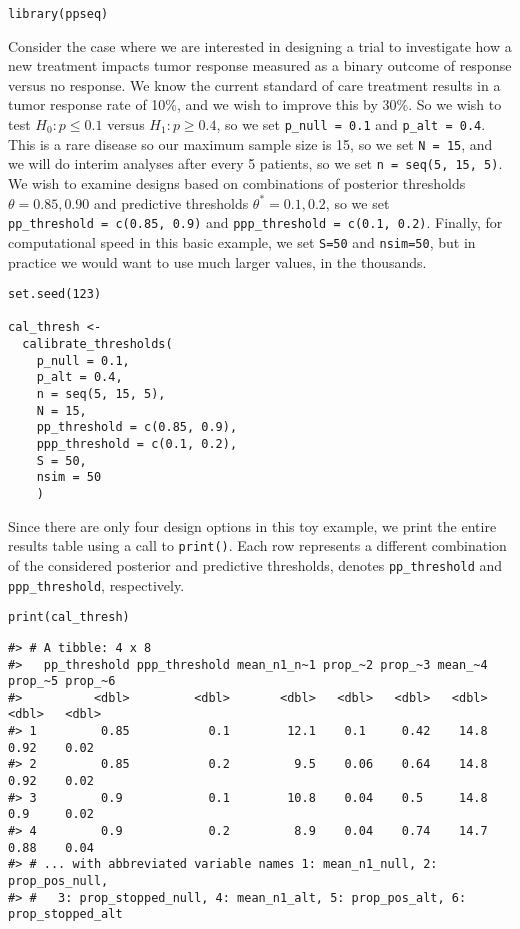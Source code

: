 \begin{verbatim}
library(ppseq)
\end{verbatim}

Consider the case where we are interested in designing a trial to investigate how a new treatment impacts tumor response measured as a binary outcome of response versus no response. We know the current standard of care treatment results in a tumor response rate of 10\%, and we wish to improve this by 30\%. So we wish to test \(H_0: p \leq 0.1\) versus \(H_1: p \geq 0.4\), so we set \texttt{p\_null\ =\ 0.1} and \texttt{p\_alt\ =\ 0.4}. This is a rare disease so our maximum sample size is 15, so we set \texttt{N\ =\ 15}, and we will do interim analyses after every 5 patients, so we set \texttt{n\ =\ seq(5,\ 15,\ 5)}. We wish to examine designs based on combinations of posterior thresholds \(\theta = {0.85, 0.90}\) and predictive thresholds \(\theta^*={0.1, 0.2}\), so we set \texttt{pp\_threshold\ =\ c(0.85,\ 0.9)} and \texttt{ppp\_threshold\ =\ c(0.1,\ 0.2)}. Finally, for computational speed in this basic example, we set \texttt{S=50} and \texttt{nsim=50}, but in practice we would want to use much larger values, in the thousands.

\begin{verbatim}
set.seed(123)

cal_thresh <-
  calibrate_thresholds(
    p_null = 0.1, 
    p_alt = 0.4,
    n = seq(5, 15, 5), 
    N = 15,
    pp_threshold = c(0.85, 0.9),
    ppp_threshold = c(0.1, 0.2),
    S = 50, 
    nsim = 50
    )
\end{verbatim}

Since there are only four design options in this toy example, we print the entire results table using a call to \texttt{print()}. Each row represents a different combination of the considered posterior and predictive thresholds, denotes \texttt{pp\_threshold} and \texttt{ppp\_threshold}, respectively.

\begin{verbatim}
print(cal_thresh)
\end{verbatim}

\begin{verbatim}
#> # A tibble: 4 x 8
#>   pp_threshold ppp_threshold mean_n1_n~1 prop_~2 prop_~3 mean_~4 prop_~5 prop_~6
#>          <dbl>         <dbl>       <dbl>   <dbl>   <dbl>   <dbl>   <dbl>   <dbl>
#> 1         0.85           0.1        12.1    0.1     0.42    14.8    0.92    0.02
#> 2         0.85           0.2         9.5    0.06    0.64    14.8    0.92    0.02
#> 3         0.9            0.1        10.8    0.04    0.5     14.8    0.9     0.02
#> 4         0.9            0.2         8.9    0.04    0.74    14.7    0.88    0.04
#> # ... with abbreviated variable names 1: mean_n1_null, 2: prop_pos_null,
#> #   3: prop_stopped_null, 4: mean_n1_alt, 5: prop_pos_alt, 6: prop_stopped_alt
\end{verbatim}


